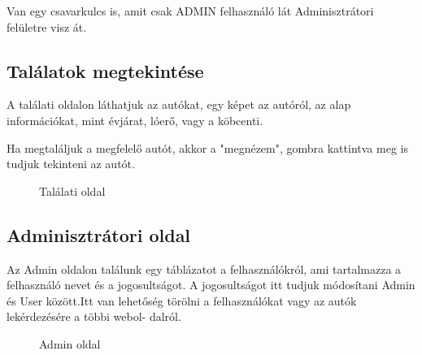 Van egy csavarkulcs is, amit csak ADMIN felhasználó lát Adminisztrátori felületre visz át.

\subsection{Találatok megtekintése}

A találati oldalon láthatjuk az autókat, egy képet az autóról, az alap információkat, mint évjárat, lóerő, vagy a köbcenti.

Ha megtaláljuk a megfelelő autót, akkor a "megnézem", gombra kattintva meg is tudjuk tekinteni az autót.
\newpage

\begin{figure}[h]
\centering
{}
\caption{Találati oldal}
\label{fig:Talalatok}
\end{figure}

\subsection{Adminisztrátori oldal}

Az Admin oldalon találunk egy táblázatot a felhasználókról, ami tartalmazza a felhasználó nevet és a jogosultságot. A jogosultságot itt tudjuk módosítani Admin és User között.Itt van lehetőség törölni a felhasználókat vagy az autók lekérdezésére a többi webol-
dalról.

\begin{figure}[h]
\centering
{}
\caption{Admin oldal}
\label{fig:Admin}
\end{figure}
\newpage

